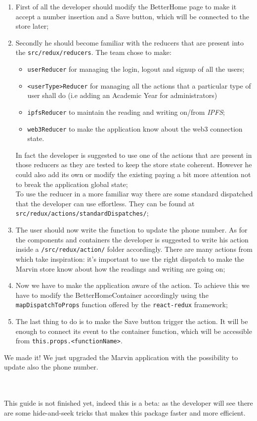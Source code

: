 \begin{enumerate}
	\item First of all the developer should modify the BetterHome page to make it accept a number insertion and a Save button, which will be connected to the store later;
	\item Secondly he should become familiar with the reducers that are present into the \verb|src/redux/reducers|. The team chose to make:
	\begin{itemize}
		\item \verb|userReducer| for managing the login, logout and signup of all the users;
		\item \verb|<userType>Reducer| for managing all the actions that a particular type of user shall do (i.e adding an Academic Year for administrators)
		\item \verb|ipfsReducer| to maintain the reading and writing on/from \emph{IPFS};
		\item \verb|web3Reducer| to make the application know about the web3 connection state.
	\end{itemize}
	In fact the developer is suggested to use one of the actions that are present in those reducers as they are tested to keep the store state coherent. However he could also add its own or modify the existing paying a bit more attention not to break the application global state;
	\\To use the reducer in a more familiar way there are some standard dispatched that the developer can use effortless. They can be found at \verb|src/redux/actions/standardDispatches/|;
	\item The user should now write the function to update the phone number. As for the components and containers the developer is suggested to write his action inside a \verb|/src/redux/action/| folder accordingly. There are many actions from which take inspiration: it's important to use the right dispatch to make the Marvin store know about how the readings and writing are going on;
	\item Now we have to make the application aware of the action. To achieve this we have to modify the BetterHomeContainer accordingly using the \verb|mapDispatchToProps| function offered by the \verb|react-redux| framework;
	\item The last thing to do is to make the Save button trigger the action. It will be enough to connect its event to the container function, which will be accessible from \verb|this.props.<functionName>|.
\end{enumerate}
We made it! We just upgraded the Marvin application with the possibility to update also the phone number.

~\\
~\\
This guide is not finished yet, indeed this is a beta: as the developer will see there are some hide-and-seek tricks that makes this package faster and more efficient.
